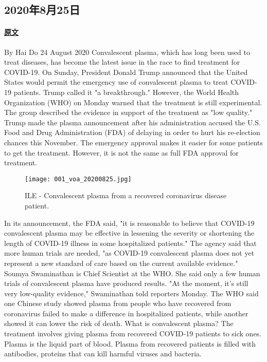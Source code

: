 \subsection{2020年8月25日}
\paragraph{\href{https://www.51voa.com/VOA\_Special\_English/covid--plasma-a-breakthrough-or-an-experiment-85234.html}{原文}}
By Hai Do
24 August 2020
Convalescent plasma, which has long been used to treat diseases, has become the latest issue in the race to find treatment for COVID-19.
On Sunday, President Donald Trump announced that the United States would permit the emergency use of convalescent plasma to treat COVID-19 patients. Trump called it "a breakthrough."
However, the World Health Organization (WHO) on Monday warned that the treatment is still experimental. The group described the evidence in support of the treatment as "low quality."
Trump made the plasma announcement after his administration accused the U.S. Food and Drug Administration (FDA) of delaying in order to hurt his re-election chances this November.
The emergency approval makes it easier for some patients to get the treatment. However, it is not the same as full FDA approval for treatment.
\begin{figure}[H]
\centering
\texttt{[image: 001\_voa\_20200825.jpg]}
\caption{ILE - Convalescent plasma from a recovered coronavirus disease patient.}
\end{figure}
In its announcement, the FDA said, "it is reasonable to believe that COVID-19 convalescent plasma may be effective in lessening the severity or shortening the length of COVID-19 illness in some hospitalized patients." The agency said that more human trials are needed, "as COVID-19 convalescent plasma does not yet represent a new standard of care based on the current available evidence."
Soumya Swaminathan is Chief Scientist at the WHO. She said only a few human trials of convalescent plasma have produced results. "At the moment, it's still very low-quality evidence," Swaminathan told reporters Monday.
The WHO said one Chinese study showed plasma from people who have recovered from coronavirus failed to make a difference in hospitalized patients, while another showed it can lower the risk of death.
What is convalescent plasma?
The treatment involves giving plasma from recovered COVID-19 patients to sick ones. Plasma is the liquid part of blood. Plasma from recovered patients is filled with antibodies, proteins that can kill harmful viruses and bacteria.
